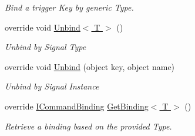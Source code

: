 \begin{DoxyCompactItemize}
\begin{DoxyCompactList}\small\item\em Bind a trigger Key by generic Type. \end{DoxyCompactList}\item 
override void \hyperlink{classstrange_1_1extensions_1_1command_1_1impl_1_1_signal_command_binder_a017bc40c1b059569e918cfee6b9b5965}{Unbind$<$ T $>$} ()
\begin{DoxyCompactList}\small\item\em Unbind by Signal Type\end{DoxyCompactList}\item 
override void \hyperlink{classstrange_1_1extensions_1_1command_1_1impl_1_1_signal_command_binder_a4a069725160e63dd054001d3f11ba29c}{Unbind} (object key, object name)
\begin{DoxyCompactList}\small\item\em Unbind by Signal Instance\end{DoxyCompactList}\item 
\hypertarget{classstrange_1_1extensions_1_1command_1_1impl_1_1_signal_command_binder_ae8a30793075075945aef8c1f3a8c2ac8}{override \hyperlink{interfacestrange_1_1extensions_1_1command_1_1api_1_1_i_command_binding}{I\-Command\-Binding} \hyperlink{classstrange_1_1extensions_1_1command_1_1impl_1_1_signal_command_binder_ae8a30793075075945aef8c1f3a8c2ac8}{Get\-Binding$<$ T $>$} ()}\label{classstrange_1_1extensions_1_1command_1_1impl_1_1_signal_command_binder_ae8a30793075075945aef8c1f3a8c2ac8}

\begin{DoxyCompactList}\small\item\em Retrieve a binding based on the provided Type. \end{DoxyCompactList}\end{DoxyCompactItemize}
